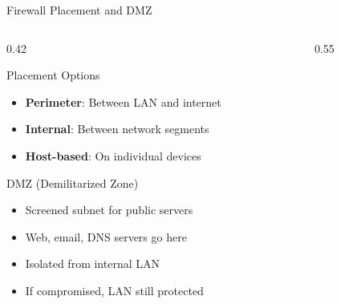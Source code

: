 \documentclass[aspectratio=169]{beamer}  %
\begin{document}
\begin{frame}{Firewall Placement and DMZ}
    \begin{columns}[T]
        \begin{column}{0.42\textwidth}
            \begin{block}{Placement Options}
                \small
                \begin{itemize}\setlength{\itemsep}{2pt}
                    \item \textbf{Perimeter}: Between LAN and internet
                    \item \textbf{Internal}: Between network segments
                    \item \textbf{Host-based}: On individual devices
                \end{itemize}
            \end{block}
            
            \vspace{0.2em}
            \begin{block}{DMZ (Demilitarized Zone)}
                \small
                \begin{itemize}\setlength{\itemsep}{2pt}
                    \item Screened subnet for public servers
                    \item Web, email, DNS servers go here
                    \item Isolated from internal LAN
                    \item If compromised, LAN still protected
                \end{itemize}
            \end{block}
        \end{column}
        \begin{column}{0.55\textwidth}
            \begin{center}
\end{center}
\end{column}
\end{columns}
\end{frame}
\end{document}
